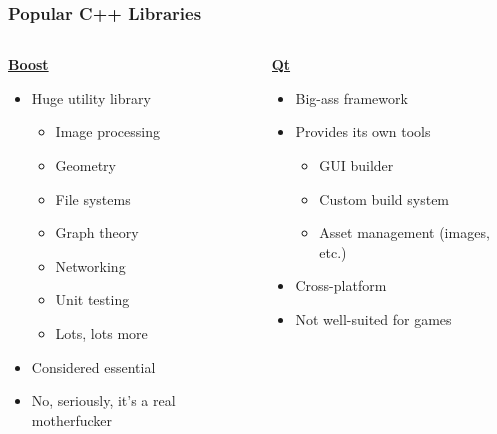 \documentclass[glossy]{beamer}
\begin{document}
\begin{frame}[fragile=singleslide]
  \frametitle{Popular C++ Libraries}

  \begin{columns}[t]
    \begin{column}{4cm}
      \textbf{\href{http://www.boost.org/}{Boost}}
      \begin{itemize}
        \item Huge utility library
        \begin{itemize}
          \item Image processing
          \item Geometry
          \item File systems
          \item Graph theory
          \item Networking
          \item Unit testing
          \item Lots, lots more
        \end{itemize}
        \item Considered essential
        \item No, seriously, it's a real motherfucker
      \end{itemize}
    \end{column}

    \begin{column}{4cm}
      \textbf{\href{http://www.qt.io/}{Qt}}
      \begin{itemize}
        \item Big-ass framework
        \item Provides its own tools
        \begin{itemize}
          \item GUI builder
          \item Custom build system
          \item Asset management (images, etc.)
        \end{itemize}
        \item Cross-platform
        \item Not well-suited for games

      \end{itemize}
    \end{column}


\end{columns}
\end{frame}
\end{document}
